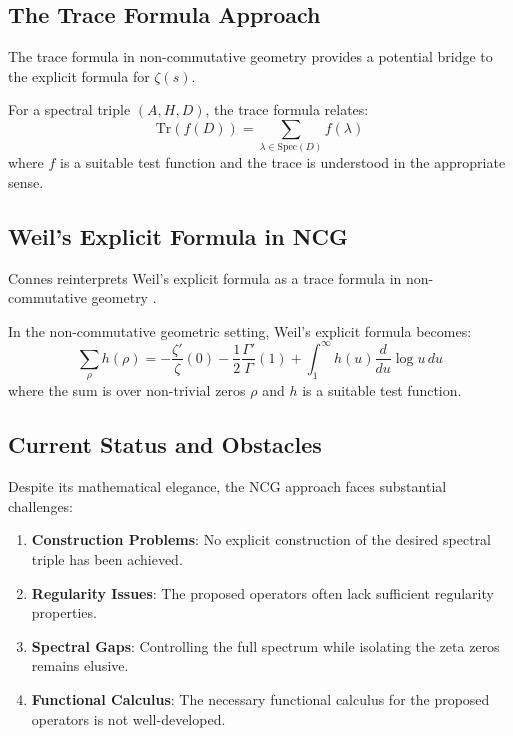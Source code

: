 \subsection{The Trace Formula Approach}

The trace formula in non-commutative geometry provides a potential bridge to the explicit formula for $\zeta(s)$.

\begin{definition}
\label{def:nc_trace_formula}
For a spectral triple $(A, H, D)$, the trace formula relates:
\begin{equation}
\text{Tr}(f(D)) = \sum_{\lambda \in \text{Spec}(D)} f(\lambda)
\label{eq:nc_trace}
\end{equation}
where $f$ is a suitable test function and the trace is understood in the appropriate sense.
\end{definition}

\subsection{Weil's Explicit Formula in NCG}

Connes reinterprets Weil's explicit formula as a trace formula in non-commutative geometry \cite{weil1952}.

\begin{theorem}
\label{thm:weil_ncg}
In the non-commutative geometric setting, Weil's explicit formula becomes:
\begin{equation}
\sum_{\rho} h(\rho) = -\frac{\zeta'}{\zeta}(0) - \frac{1}{2}\frac{\Gamma'}{\Gamma}(1) + \int_1^{\infty} h(u) \frac{d}{du} \log u \, du
\label{eq:weil_ncg}
\end{equation}
where the sum is over non-trivial zeros $\rho$ and $h$ is a suitable test function.
\end{theorem}

\subsection{Current Status and Obstacles}

Despite its mathematical elegance, the NCG approach faces substantial challenges:

\begin{enumerate}
\item \textbf{Construction Problems}: No explicit construction of the desired spectral triple has been achieved.

\item \textbf{Regularity Issues}: The proposed operators often lack sufficient regularity properties.

\item \textbf{Spectral Gaps}: Controlling the full spectrum while isolating the zeta zeros remains elusive.

\item \textbf{Functional Calculus}: The necessary functional calculus for the proposed operators is not well-developed.
\end{enumerate}

